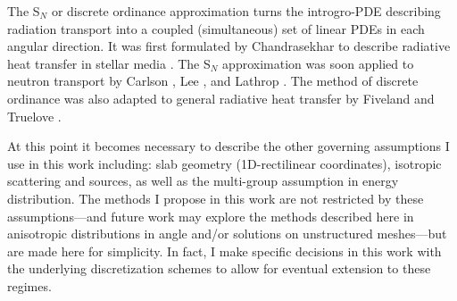 The S$_N$ or discrete ordinance approximation turns the introgro-PDE describing radiation transport into a coupled (simultaneous) set of linear PDEs in each angular direction.
It was first formulated by Chandrasekhar to describe radiative heat transfer in stellar media \cite{chandrasekhar1960radiative}.
The S$_N$ approximation was soon applied to neutron transport by Carlson \cite{precise1971carlson}, Lee \cite{discrete1961lee}, and Lathrop \cite{discrete1966lathnrop}.
The method of discrete ordinance was also adapted to general radiative heat transfer by Fiveland \cite{three1988fiveland} and Truelove \cite{discrete1987truelove}.

At this point it becomes necessary to describe the other governing assumptions I use in this work including:
slab geometry (1D-rectilinear coordinates), isotropic scattering and sources, as well as the multi-group assumption in energy distribution.
The methods I propose in this work are not restricted by these assumptions---and future work may explore the methods described here in anisotropic distributions in angle and/or solutions on unstructured meshes---but are made here for simplicity.
In fact, I make specific decisions in this work with the underlying discretization schemes to allow for eventual extension to these regimes.

